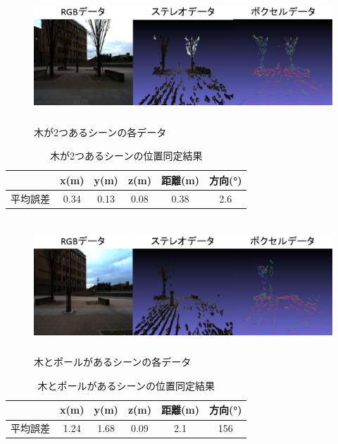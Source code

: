 %
\begin{figure}[htbp]
  \begin{center}
   \includegraphics[height=50mm]{figure/木が2つあるシーン.eps}
   \caption{木が2つあるシーンの各データ}
   \label{木が2つあるシーン}
  \end{center}
\end{figure}
%
\begin{table}[htbp]
\begin{center}
\begin{tabular}{|c|c|c|c|c|c|} \hline
\  & x(m) & y(m) & z(m) & 距離(m) & 方向(°)\\ \hline
平均誤差 & 0.34 & 0.13 & 0.08 & 0.38 & 2.6\\ \hline
\end{tabular}
\caption{木が2つあるシーンの位置同定結果}
\end{center}
\end{table}
%
\begin{figure}[htbp]
  \begin{center}
   \includegraphics[height=50mm]{figure/木とポールがあるシーン.eps}
   \caption{木とポールがあるシーンの各データ}
   \label{木とポールがあるシーン}
  \end{center}
\end{figure}
%
\begin{table}[htbp]
\begin{center}
\begin{tabular}{|c|c|c|c|c|c|} \hline
\  & x(m) & y(m) & z(m) & 距離(m) & 方向(°)\\ \hline
平均誤差 & 1.24 & 1.68 & 0.09 & 2.1 & 156\\ \hline
\end{tabular}
\caption{木とポールがあるシーンの位置同定結果}
\end{center}
\end{table}
%

